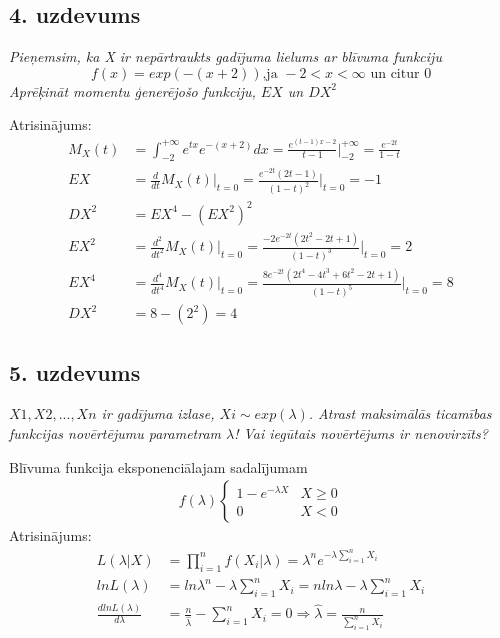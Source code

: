 \documentclass[a4paper,10pt]{article}
\begin{document}
\subsection*{4. uzdevums}
\textit{Pieņemsim, ka X ir nepārtraukts gadījuma
lielums ar blīvuma funkciju
$$f(x)=exp(-(x+2))\text{,ja }-2<x<\infty \text{ un citur }0$$
Aprēķināt momentu ģenerējošo funkciju, $EX$ un $DX^2$\\}

Atrisinājums:
\begin{align*}
M_X(t)&=\int_{-2}^{+\infty}e^{tx}e^{-(x+2)}dx=\frac{e^{(t-1)x-2}}{t-1}\bigg\vert_{-2}^{+\infty}=\frac{e^{-2t}}{1-t}
\\EX&=\frac{d}{dt}M_X(t)\bigg\vert_{t=0}=\frac{e^{-2t}(2t-1)}{(1-t)^2}\bigg\vert_{t=0}=-1
\\DX^2&=EX^4-(EX^2)^2
\\EX^2&=\frac{d^2}{dt^2}M_X(t)\vert_{t=0}=\frac{-2e^{-2t}(2t^2-2t+1)}{(1-t)^3}\bigg\vert_{t=0}=2
\\EX^4&=\frac{d^4}{dt^4}M_X(t)\vert_{t=0}=\frac{8e^{-2t}(2t^4-4t^3+6t^2-2t+1)}{(1-t)^5}\bigg\vert_{t=0}=8
\\DX^2&=8-(2^2)=4
\end{align*}

\subsection*{5. uzdevums}
\textit{$X1, X2, . . . , Xn$ ir gadījuma izlase, $Xi ∼ exp(\lambda)$.
Atrast maksimālās ticamības funkcijas novērtējumu
parametram $\lambda$! Vai iegūtais novērtējums ir nenovirzīts?}


Blīvuma funkcija eksponenciālajam sadalījumam
\begin{align*}
f(\lambda)\begin{cases}1-e^{-\lambda X} &X\geq 0\\ 0 &X<0 \end{cases}
\end{align*}
Atrisinājums:
\begin{align*}
L(\lambda|X)&=\prod^n_{i=1}f(X_i|\lambda)=\lambda^ne^{-\lambda\sum_{i=1}^nX_i}\\
lnL(\lambda)&=ln\lambda^n-\lambda \sum_{i=1}^nX_i=nln\lambda-\lambda\sum_{i=1}^nX_i\\
\frac{dlnL(\lambda)}{d\lambda}&=\frac{n}{\hat{\lambda}}-\sum_{i=1}^nX_i=0\Rightarrow \hat{\lambda}= \frac{n}{\sum_{i=1}^nX_i}
\end{align*}

\end{document}
